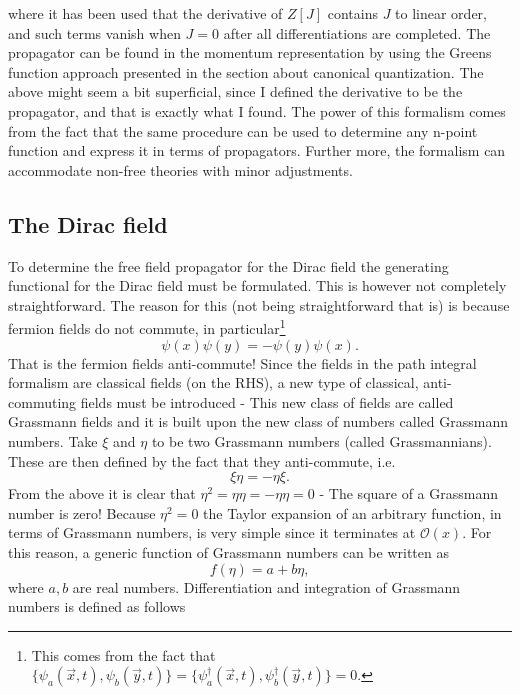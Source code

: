 where it has been used that the derivative of $Z[J]$ contains $J$ to linear order, and such terms vanish when $J=0$ after all differentiations are completed. The propagator can be found in the momentum representation by using the Greens function approach presented in the section about canonical quantization. The above might seem a bit superficial, since I defined the derivative to be the propagator, and that is exactly what I found. The power of this formalism comes from the fact that the same procedure can be used to determine any n-point function and express it in terms of propagators. Further more, the formalism can accommodate non-free theories with minor adjustments.

\subsection*{The Dirac field} 	
To determine the free field propagator for the Dirac field the generating functional for the Dirac field must be formulated. This is however not completely straightforward. The reason for this (not being straightforward that is) is because fermion fields do not commute, in particular\footnote{This comes from the fact that $\{\psi_a(\vec{x},t),\psi_b(\vec{y},t)\}=\{\psi_a^\dagger(\vec{x},t),\psi_b^\dagger(\vec{y},t)\}=0$.}
\begin{equation}
	\psi(x)\psi(y)=-\psi(y)\psi(x).
\end{equation} 
That is the fermion fields anti-commute! Since the fields in the path integral formalism are classical fields (on the RHS), a new type of classical, anti-commuting fields must be introduced - This new class of fields are called Grassmann fields and it is built upon the new class of numbers called Grassmann numbers. Take $\xi$ and $\eta$ to be two Grassmann numbers (called Grassmannians). These are then defined by the fact that they anti-commute, i.e.
\begin{equation}
	\xi\eta=-\eta\xi.
\end{equation} 
From the above it is clear that $\eta^2=\eta\eta=-\eta\eta=0$ - The square of a Grassmann number is zero! Because $\eta^2=0$ the Taylor expansion of an arbitrary function, in terms of Grassmann numbers, is very simple since it terminates at $\mathcal{O}(x)$. For this reason, a generic function of Grassmann numbers can be written as
\begin{equation}
	f(\eta)=a+b\eta,
\end{equation} 
where $a,b$ are real numbers. Differentiation and integration of Grassmann numbers is defined as follows

